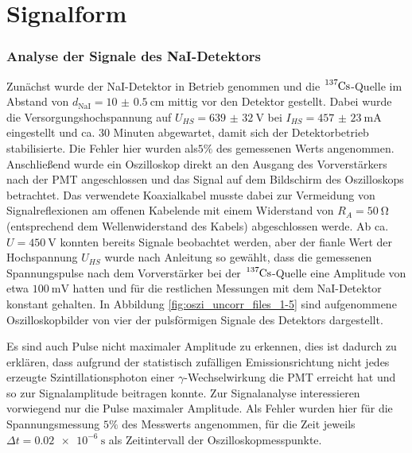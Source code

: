 \chapter{Signalform} \label{sec:signalform}


\subsection{Analyse der Signale des NaI-Detektors} \label{sec:signal_nai}

Zunächst wurde der NaI-Detektor in Betrieb genommen und die $\ce{ ^137Cs }$-Quelle im Abstand von $d_\text{NaI}=\SI{10(0.5)}{\centi\meter}$ mittig vor den Detektor gestellt. Dabei wurde die Versorgungshochspannung auf $U_{HS}=\SI{639(32)}{\V}$ bei $I_{HS}=\SI{457(23)}{\milli\A}$ eingestellt und ca. 30 Minuten abgewartet, damit sich der Detektorbetrieb stabilisierte. Die Fehler hier wurden als$5\%$ des gemessenen Werts angenommen. Anschließend wurde ein Oszilloskop direkt an den Ausgang des Vorverstärkers nach der PMT angeschlossen und das Signal auf dem Bildschirm des Oszilloskops betrachtet. Das verwendete Koaxialkabel musste dabei zur Vermeidung von Signalreflexionen am offenen Kabelende mit einem Widerstand von $R_A=\SI{50}{\ohm}$ (entsprechend dem Wellenwiderstand des Kabels) abgeschlossen werde. Ab ca. $U=\SI{450}{\V}$ konnten bereits Signale beobachtet werden, aber der fianle Wert der Hochspannung $U_{HS}$ wurde nach Anleitung so gewählt, dass die gemessenen Spannungspulse nach dem Vorverstärker bei der $\ce{ ^137Cs }$-Quelle eine Amplitude von etwa $\SI{100}{\milli\V}$ hatten und für die restlichen Messungen mit dem NaI-Detektor konstant gehalten. In Abbildung \ref{fig:oszi_uncorr_files_1-5} sind aufgenommene Oszilloskopbilder von vier der pulsförmigen Signale des Detektors dargestellt.


Es sind auch Pulse nicht maximaler Amplitude zu erkennen, dies ist dadurch zu erklären, dass aufgrund der statistisch zufälligen Emissionsrichtung nicht jedes erzeugte Szintillationsphoton einer $\gamma$-Wechselwirkung die PMT erreicht hat und so zur Signalamplitude beitragen konnte. Zur Signalanalyse interessieren vorwiegend nur die Pulse maximaler Amplitude. Als Fehler wurden hier für die Spannungsmessung $5\%$ des Messwerts angenommen, für die Zeit jeweils $\Delta t = \SI{0.02e-6}{\second}$ als Zeitintervall der Oszilloskopmesspunkte.

